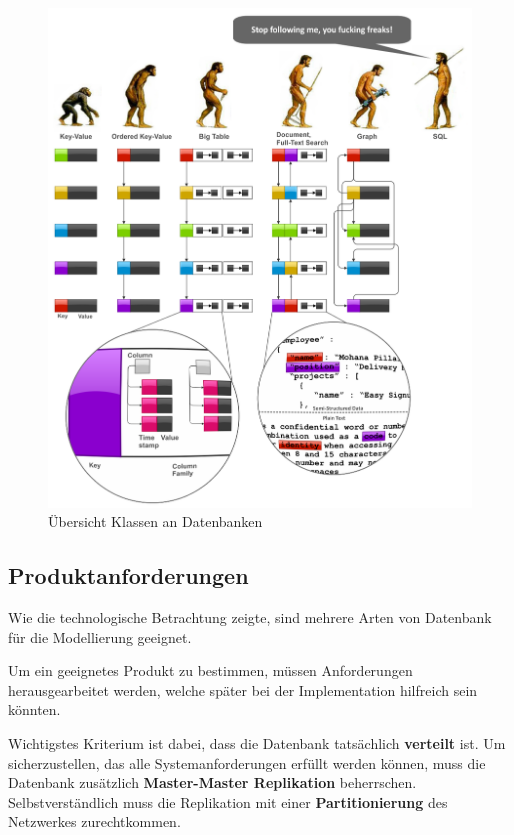 \begin{figure}
    \includegraphics[width=\textwidth]{images/databases-overview.png}
    \caption{Übersicht Klassen an Datenbanken}
    \label{fig:klassen-datenbanken}
\end{figure}

\subsection{Produktanforderungen}

Wie die technologische Betrachtung zeigte,
sind mehrere Arten von Datenbank für die Modellierung geeignet.

Um ein geeignetes Produkt zu bestimmen,
m\"ussen Anforderungen herausgearbeitet werden,
welche sp\"ater bei der Implementation hilfreich sein k\"onnten.

Wichtigstes Kriterium ist dabei, dass die Datenbank tats\"achlich \textbf{verteilt} ist.
Um sicherzustellen, das alle Systemanforderungen erf\"ullt werden k\"onnen,
muss die Datenbank zus\"atzlich \textbf{Master-Master Replikation} beherrschen.
Selbstverst\"andlich muss die Replikation mit einer \textbf{Partitionierung} des Netzwerkes zurechtkommen.

